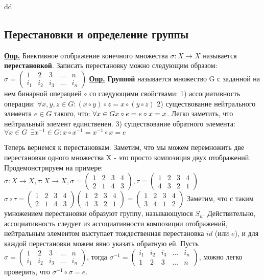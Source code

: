 dd\documentclass{article}
\begin{document}
\begin{obeylines}
	
	\section*{Перестановки и определение группы}
	\underline{\textbf{Опр.}} Биективное отображение конечного множества $\sigma:  X \rightarrow X$ называется \textbf{перестановкой}.
	Записать перестановку можно следующим образом:
	$\sigma = \begin{pmatrix} 1 & 2 & 3 & ... & n \\ i_{1} & i_{2} & i_{3} & ... & i_{n} \end{pmatrix}$
	\underline{\textbf{Опр.}} \textbf{Группой} называется множество G с заданной на нем бинарной операцией $\circ$ со следующими свойствами:
		1) ассоциативность операции: $\forall x, y, z \in G: (x \circ y) \circ z = x \circ (y \circ z)$
		2) существование нейтрального элемента $e \in G$ такого, что: $\forall x \in G \\ x \circ e = e \circ x = x$. Легко заметить, что нейтральный элемент единственен.
		3) существование обратного элемента: $\forall x \in G \ \: \exists x^{-1}\in G: x \circ x^{-1} = x^{-1} \circ x = e$
		
	Теперь вернемся к перестановкам. Заметим, что мы можем перемножить две перестановки одного множества X - это просто композиция двух отображений. Продемонстрируем на примере:
	$ \sigma : X \rightarrow X, \tau : X \rightarrow X, \sigma = \begin{pmatrix} 1 & 2 & 3 & 4 \\ 2 & 1 & 4 & 3 \end{pmatrix}, \tau = \begin{pmatrix} 1 & 2 & 3 & 4 \\ 4 & 3 & 2 & 1 \end{pmatrix}$
	$\sigma \circ \tau = \begin{pmatrix} 1 & 2 & 3 & 4 \\ 2 & 1 & 4 & 3 \end{pmatrix} \begin{pmatrix} 1 & 2 & 3 & 4 \\ 4 & 3 & 2 & 1 \end{pmatrix} = \begin{pmatrix} 1 & 2 & 3 & 4 \\ 3 & 4 & 1 & 2 \end{pmatrix}$
	Заметим, что с таким умножением перестановки образуют группу, называющуюся $S_{n}$. Действительно, ассоциативность следует из ассоциативности композиции отображений, нейтральным элементом выступает тождественная перестановка $id$ (или $e$), и для каждой перестановки можем явно указать обратную ей. Пусть $ \sigma = \begin{pmatrix} 1 & 2 & 3 & ... & n \\ i_{1} & i_{2} & i_{3} & ... & i_{n} \end{pmatrix}$, тогда $\sigma^{-1} = \begin{pmatrix} i_{1} & i_{2} & i_{3} & ... & i_{n} \\ 1 & 2 & 3 & ... & n \end{pmatrix}$, можно легко проверить, что $\sigma^{-1} \circ \sigma = e$.
	

\end{obeylines}
\end{document}
